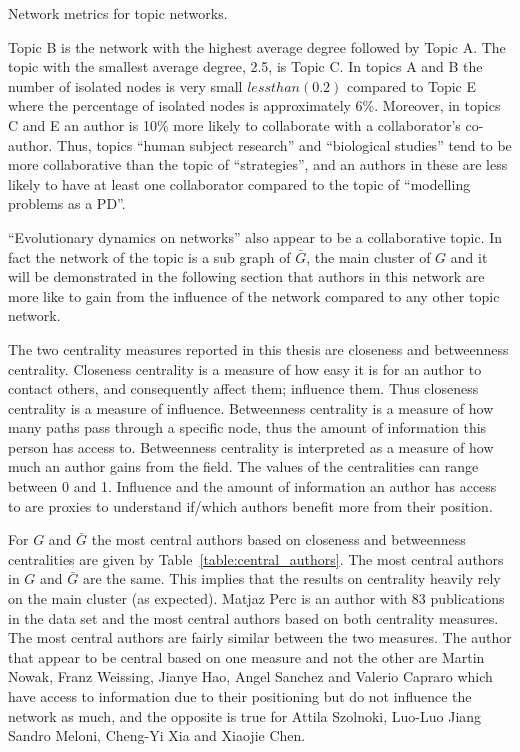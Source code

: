 \begin{table}[!hbtp]
    \centering
    \resizebox{\textwidth}{!}{
    }
    \caption{Network metrics for topic networks.}\label{table:topics_networks}
\end{table}

Topic B is the network with the highest average degree followed by Topic A. The
topic with the smallest average degree, 2.5, is Topic C. In topics A and B the
number of isolated nodes is very small \(less than (0.2)\) compared to Topic E where the
percentage of isolated nodes is approximately 6\%. Moreover, in topics C and E
an author is 10\% more likely to collaborate with a collaborator's co-author.
Thus, topics ``human subject research'' and ``biological studies'' tend
to be more collaborative than the topic of ``strategies'', and an authors in
these are less likely to have at least one collaborator compared to the topic of
``modelling problems as a PD''.

``Evolutionary dynamics on networks'' also appear to be a collaborative topic.
In fact the network of the topic  is a
sub graph of \(\bar{G}\), the main cluster of \(G\) and it will be demonstrated in the following section that
authors in this network are more like to gain from the influence of the network
compared to any other topic network.

The two centrality measures reported in this thesis are closeness and
betweenness centrality. Closeness centrality is a measure of how easy it is for
an author to contact others, and consequently affect them; influence them. Thus
closeness centrality is a measure of influence. Betweenness centrality is a
measure of how many paths pass through a specific node, thus the amount of
information this person has access to. Betweenness centrality is interpreted as a
measure of how much an author gains from the field. The values of the centralities
can range between 0 and 1. Influence and the amount of information
an author has access to are proxies to understand if/which authors benefit more
from their position.

For \(G\) and \(\bar{G}\) the most central authors based on closeness and
betweenness centralities are given by Table~\ref{table:central_authors}. The
most central authors in \(G\) and \(\bar{G}\) are the same. This implies that
the results on centrality heavily rely on the main cluster (as expected). Matjaz Perc is an
author with 83 publications in the data set and the most central authors based
on both centrality measures. The most central authors are fairly similar between
the two measures. The author that appear to be central based on one measure and
not the other are Martin Nowak, Franz Weissing, Jianye Hao, Angel Sanchez and
Valerio Capraro which have access to information due to their
positioning but do not influence the network as much, and the opposite is true
for Attila Szolnoki, Luo-Luo Jiang Sandro Meloni, Cheng-Yi Xia and Xiaojie Chen.

